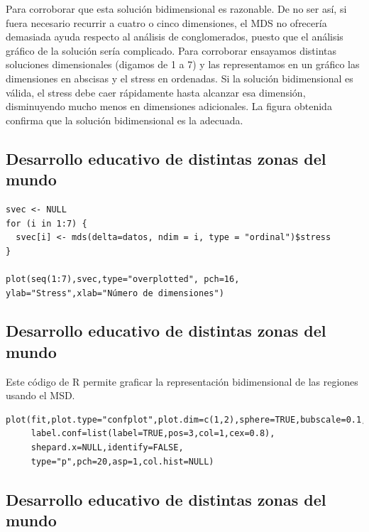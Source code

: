 \documentclass[]{article}
\begin{document}
\hypertarget{right}{}
Para corroborar que esta solución bidimensional es razonable. De no ser
así, si fuera necesario recurrir a cuatro o cinco dimensiones, el MDS no
ofrecería demasiada ayuda respecto al análisis de conglomerados, puesto
que el análisis gráfico de la solución sería complicado. Para corroborar
ensayamos distintas soluciones dimensionales (digamos de 1 a 7) y las
representamos en un gráfico las dimensiones en abscisas y el stress en
ordenadas. Si la solución bidimensional es válida, el stress debe caer
rápidamente hasta alcanzar esa dimensión, disminuyendo mucho menos en
dimensiones adicionales. La figura obtenida confirma que la solución
bidimensional es la adecuada.

\subsection{Desarrollo educativo de distintas zonas del
mundo}\label{desarrollo-educativo-de-distintas-zonas-del-mundo-9}

\begin{verbatim}
svec <- NULL
for (i in 1:7) {
  svec[i] <- mds(delta=datos, ndim = i, type = "ordinal")$stress
}

plot(seq(1:7),svec,type="overplotted", pch=16, ylab="Stress",xlab="Número de dimensiones")
\end{verbatim}

\subsection{Desarrollo educativo de distintas zonas del
mundo}\label{desarrollo-educativo-de-distintas-zonas-del-mundo-10}

Este código de R permite graficar la representación bidimensional de las
regiones usando el MSD.

\begin{verbatim}
plot(fit,plot.type="confplot",plot.dim=c(1,2),sphere=TRUE,bubscale=0.1,col=1,
     label.conf=list(label=TRUE,pos=3,col=1,cex=0.8),
     shepard.x=NULL,identify=FALSE,
     type="p",pch=20,asp=1,col.hist=NULL)
\end{verbatim}

\subsection{Desarrollo educativo de distintas zonas del
mundo}\label{desarrollo-educativo-de-distintas-zonas-del-mundo-11}
\end{document}
